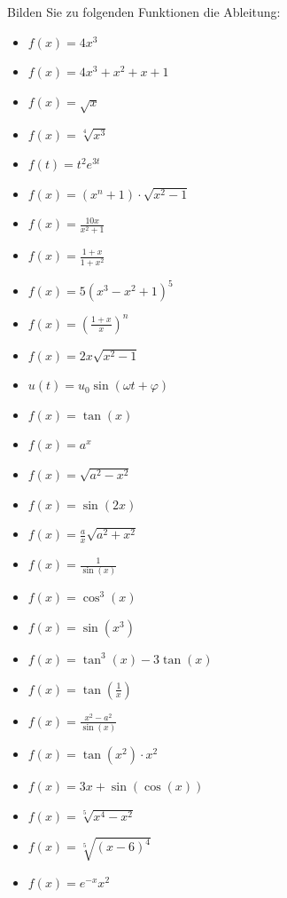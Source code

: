 \begin{ExerciseBlock}
Bilden Sie zu folgenden Funktionen die Ableitung:
\par
\begin{minipage}[t]{0.5\textwidth}
	\begin{itemize}
		\item $f(x) = 4x^3$ 
		\item $f(x) = 4x^3 + x^2 + x + 1$
		\item $f(x) = \sqrt{x}$ 
		\item $f(x) = \sqrt[4]{x^3}$
		\item $f(t) = t^2 e^{3t}$
		\item $f(x) = (x^n+1)\cdot\sqrt{x^2-1}$
		\item $f(x) = \frac{10x}{x^2+1}$
		\item $f(x) = \frac{1+x}{1+x^2}$
		\item $f(x) = 5(x^3-x^2+1)^5$
		\item $f(x) = \left(\frac{1+x}{x} \right)^n$
		\item $f(x) = 2x \sqrt{x^2-1}$
		\item $u(t) = u_0 \sin(\omega t +\varphi)$
		\item $f(x) = \tan(x)$
		\item $f(x) = a^x$
	\end{itemize}	
\end{minipage}
\begin{minipage}[t]{0.49\textwidth}
	\begin{itemize}
		\item $f(x) = \sqrt{a^2-x^2}$
		\item $f(x) = \sin(2x)$
		\item $f(x) = \frac{a}{x}\sqrt{a^2+x^2}$
		\item $f(x) = \frac{1}{\sin(x)}$
		\item $f(x) = \cos^3(x)$
		\item $f(x) = \sin(x^3)$
		\item $f(x) = \tan^3(x)-3\tan(x)$
		\item $f(x) = \tan\left(\frac{1}{x}\right)$
		\item $f(x) = \frac{x^2-a^2}{\sin(x)}$
		\item $f(x) = \tan(x^2) \cdot x^2$
		\item $f(x) = 3x + \sin(\cos(x))$
		\item $f(x) = \sqrt[5]{x^4-x^2}$
		\item $f(x) = \sqrt[5]{(x-6)^4}$
		\item $f(x) = e^{-x} x^2$
	\end{itemize}	
\end{minipage}

\end{ExerciseBlock}
